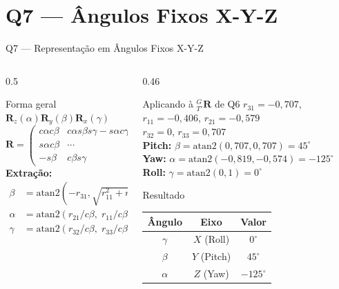 \documentclass[aspectratio=169,12pt]{beamer}
\newcommand{\Rx}[1]{\mathbf{R}_x(#1)}
\newcommand{\Ry}[1]{\mathbf{R}_y(#1)}
\newcommand{\Rz}[1]{\mathbf{R}_z(#1)}
\newcommand{\degr}{^{\circ}}
\newcommand{\mat}[1]{\begin{pmatrix}#1\end{pmatrix}}
\begin{document}
\section{Q7 --- Ângulos Fixos X-Y-Z}

\begin{frame}{Q7 --- Representação em Ângulos Fixos X-Y-Z}
  \begin{columns}
    \begin{column}{0.5\textwidth}
      \begin{block}{Forma geral $\Rz{\alpha}\Ry{\beta}\Rx{\gamma}$}
        \[
          \mathbf{R} = \mat{
            c\alpha c\beta & c\alpha s\beta s\gamma - s\alpha c\gamma & \cdots\\
            s\alpha c\beta & \cdots & \cdots\\
            -s\beta & c\beta s\gamma & c\beta c\gamma}
        \]
        \textbf{Extração:}
        \begin{align*}
          \beta  &= \mathrm{atan2}(-r_{31},\sqrt{r_{11}^2+r_{21}^2})\\
          \alpha &= \mathrm{atan2}(r_{21}/c\beta,\;r_{11}/c\beta)\\
          \gamma &= \mathrm{atan2}(r_{32}/c\beta,\;r_{33}/c\beta)
        \end{align*}
      \end{block}
    \end{column}
    \begin{column}{0.46\textwidth}
      \begin{block}{Aplicando à ${}^{G}_{T'}\mathbf{R}$ de Q6}
        \small
        $r_{31}=-0{,}707$, $r_{11}=-0{,}406$, $r_{21}=-0{,}579$\\
        $r_{32}=0$, $r_{33}=0{,}707$\\[6pt]
        \textbf{Pitch:}
        $\beta=\mathrm{atan2}(0{,}707,0{,}707)=45\degr$\\[4pt]
        \textbf{Yaw:}
        $\alpha=\mathrm{atan2}(-0{,}819,-0{,}574)=-125\degr$\\[4pt]
        \textbf{Roll:}
        $\gamma=\mathrm{atan2}(0,1)=0\degr$
      \end{block}
      \begin{exampleblock}{Resultado}
        \centering
        \begin{tabular}{ccc}
          \toprule
          Ângulo & Eixo & Valor\\
          \midrule
          $\gamma$ & $X$ (Roll)  & $0\degr$\\
          $\beta$  & $Y$ (Pitch) & $45\degr$\\
          $\alpha$ & $Z$ (Yaw)   & $-125\degr$\\
          \bottomrule
        \end{tabular}
      \end{exampleblock}
    \end{column}
  \end{columns}
\end{frame}
\end{document}
